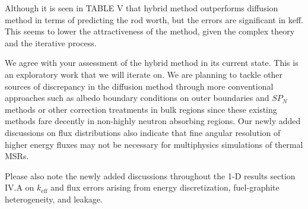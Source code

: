 \documentclass[answers,11pt]{exam}
\begin{document}
\begin{questions}
    \question Although it is seen in TABLE V that hybrid method outperforms diffusion method in terms of predicting the rod worth, but the errors are significant in keff. This seems to lower the attractiveness of the method, given the complex theory and the iterative process.
    \begin{solution}
        We agree with your assessment of the hybrid method in its current state. This is
        an exploratory work that we will iterate on.
        We are planning to tackle other sources of discrepancy in the diffusion method through
        more conventional approaches such as
        albedo boundary conditions on outer boundaries and $SP_N$ methods or other correction
        treatments in bulk regions since these existing methods fare decently in non-highly
        neutron absorbing regions. Our newly added discussions on flux distributions also indicate
        that fine angular resolution of higher energy fluxes may not be necessary for multiphysics
        simulations of thermal MSRs.

        Please also note the newly added discussions throughout the 1-D results
        section IV.A on $k_\text{eff}$ and flux errors arising from energy discretization,
        fuel-graphite heterogeneity, and leakage.
    \end{solution}

\end{questions}
\end{document}
